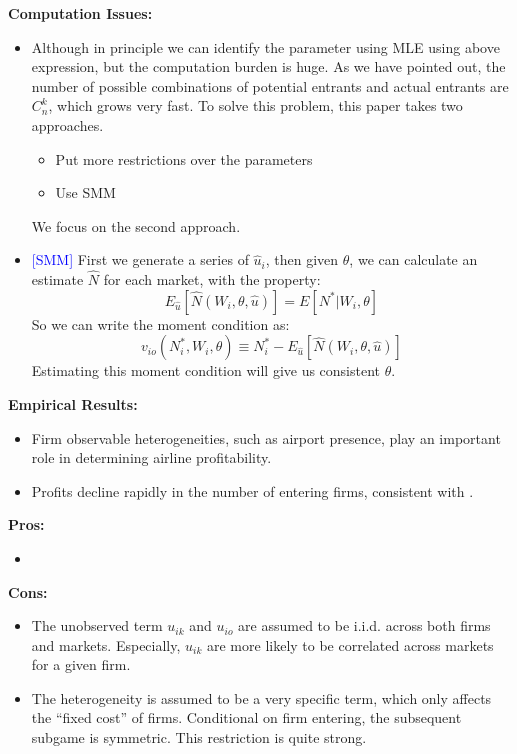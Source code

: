 \documentclass{book}
\theoremstyle{plain}
\theoremstyle{definition}
\begin{document}
\vspace{1em}
\noindent
\textbf{Computation Issues:}
\begin{itemize}
	\item Although in principle we can identify the parameter using MLE using above expression, but the computation burden is huge. As we have pointed out, the number of possible combinations of potential entrants and actual entrants are $C_n^k$, which grows very fast.
	To solve this problem, this paper takes two approaches.
	\begin{itemize}
		\item Put more restrictions over the parameters
		\item Use SMM
	\end{itemize}
	We focus on the second approach.

	\item \textcolor{blue}{[SMM]}
	First we generate a series of $\hat u_i$, then given $\theta$, we can calculate an estimate $\hat N$ for each market, with the property:
	\[E_{\hat u}[\hat N(W_i,\theta,\hat u)] = E[N^*|W_i,\theta]\]
	So we can write the moment condition as:
	\[v_{io}(N_i^*,W_i,\theta)\equiv N^*_i-E_{\hat u}[\hat N(W_i,\theta,\hat u)]\]
	Estimating this moment condition will give us consistent $\theta$.
\end{itemize}


\vspace{1em}
\noindent
\textbf{Empirical Results:}
\begin{itemize}
	\item Firm observable heterogeneities, such as airport presence, play an important role in determining airline profitability.

	\item Profits decline rapidly in the number of entering firms, consistent with \cite{Bresnahan:1990gw}.
\end{itemize}

\vspace{1em}
\noindent
\textbf{Pros:}
\begin{itemize}
	\item 
\end{itemize}

\vspace{1em}
\noindent
\textbf{Cons:}
\begin{itemize}
	\item The unobserved term $u_{ik}$ and $u_{io}$ are assumed to be i.i.d. across both firms and markets.
	Especially, $u_{ik}$ are more likely to be correlated across markets for a given firm.

	\item The heterogeneity is assumed to be a very specific term, which only affects the ``fixed cost'' of firms. Conditional on firm entering, the subsequent subgame is symmetric. This restriction is quite strong.
\end{itemize}
\end{document}
